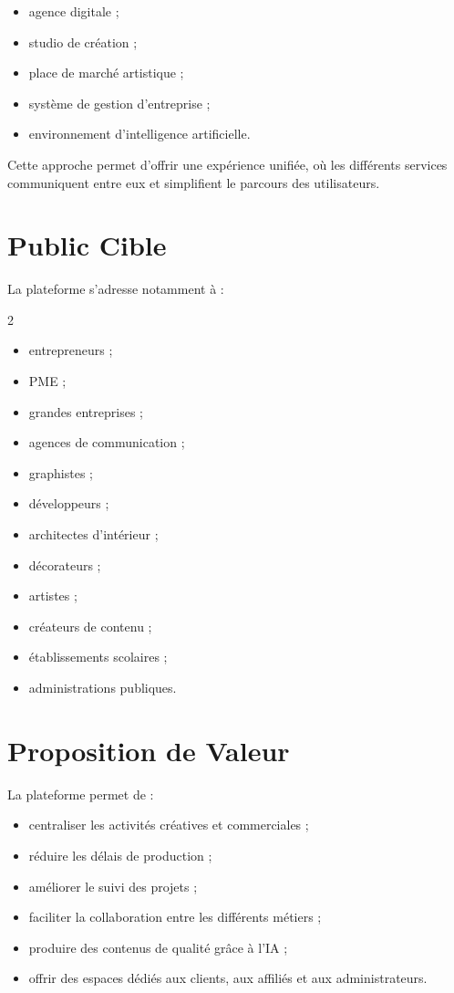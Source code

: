 \documentclass[12pt,a4paper,oneside]{book}
\begin{document}
\begin{itemize}
\item agence digitale ;
\item studio de création ;
\item place de marché artistique ;
\item système de gestion d'entreprise ;
\item environnement d'intelligence artificielle.
\end{itemize}

Cette approche permet d'offrir une expérience unifiée, où les différents services communiquent entre eux et simplifient le parcours des utilisateurs.

\chapter{Public Cible}

La plateforme s'adresse notamment à :

\begin{multicols}{2}
\begin{itemize}
\item entrepreneurs ;
\item PME ;
\item grandes entreprises ;
\item agences de communication ;
\item graphistes ;
\item développeurs ;
\item architectes d'intérieur ;
\item décorateurs ;
\item artistes ;
\item créateurs de contenu ;
\item établissements scolaires ;
\item administrations publiques.
\end{itemize}
\end{multicols}

\chapter{Proposition de Valeur}

La plateforme permet de :

\begin{itemize}
\item centraliser les activités créatives et commerciales ;
\item réduire les délais de production ;
\item améliorer le suivi des projets ;
\item faciliter la collaboration entre les différents métiers ;
\item produire des contenus de qualité grâce à l'IA ;
\item offrir des espaces dédiés aux clients, aux affiliés et aux administrateurs.
\end{itemize}
\end{document}
